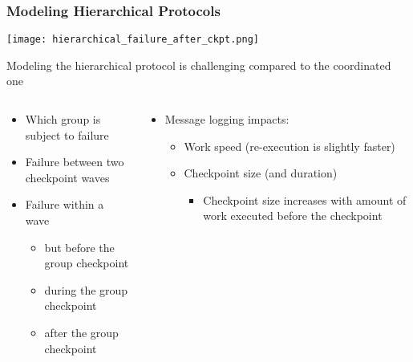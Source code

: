 \begin{frame}
  \frametitle{Modeling Hierarchical Protocols}

  \begin{center}
    \texttt{[image: hierarchical\_failure\_after\_ckpt.png]}
  \end{center}

  Modeling the hierarchical protocol is challenging compared to the coordinated one
  
  \begin{columns}
    \begin{column}{.49\textwidth}
      \begin{itemize}
      \item Which group is subject to failure
      \item Failure between two checkpoint waves
      \item Failure within a wave
        \begin{itemize}
        \item but before the group checkpoint
        \item during the group checkpoint
        \item after the group checkpoint
        \end{itemize}
      \end{itemize}
    \end{column}\begin{column}{.49\textwidth}
      \begin{itemize}
      \item Message logging impacts:
        \begin{itemize}
        \item Work speed (re-execution is slightly faster)
        \item Checkpoint size (and duration)
          \begin{itemize}
          \item Checkpoint size increases with amount of work executed before the checkpoint
          \end{itemize}
        \end{itemize}
      \end{itemize}
    \end{column}
  \end{columns}
  
\end{frame}

